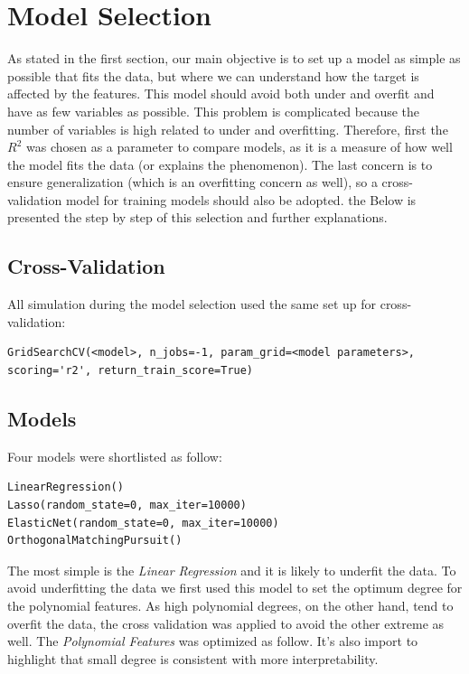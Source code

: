 \documentclass[11pt, a4]{article}
\begin{document}
\section*{Model Selection}

As stated in the first section, our main objective is to set up a model as simple as possible that fits the data, but where we can understand how the target is affected by the features. This model should avoid both under and overfit and have as few variables as possible. This problem is complicated because the number of variables is high related to under and overfitting. Therefore, first the $R^2$ was chosen as a parameter to compare models, as it is a measure of how well the model fits the data (or explains the phenomenon).
The last concern is to ensure generalization (which is an overfitting concern as well), so a cross-validation model for training models should also be adopted. the Below is presented the step by step of this selection and further explanations.

\subsection{Cross-Validation}

All simulation during the model selection used the same set up for cross-validation:

\begin{lstlisting} 
GridSearchCV(<model>, n_jobs=-1, param_grid=<model parameters>, 
scoring='r2', return_train_score=True)
\end{lstlisting}

\subsection{Models}

Four models were shortlisted as follow:

\begin{lstlisting} 
LinearRegression()
Lasso(random_state=0, max_iter=10000)
ElasticNet(random_state=0, max_iter=10000)
OrthogonalMatchingPursuit()
\end{lstlisting}

The most simple is the \textit{Linear Regression} and it is likely to underfit the data. To avoid underfitting the data we first used this model to set the optimum degree for the polynomial features. As high polynomial degrees, on the other hand, tend to overfit the data, the cross validation was applied to avoid the other extreme as well. The \textit{Polynomial Features} was optimized as follow. It's also import to highlight that small degree is consistent with more interpretability.
\end{document}
